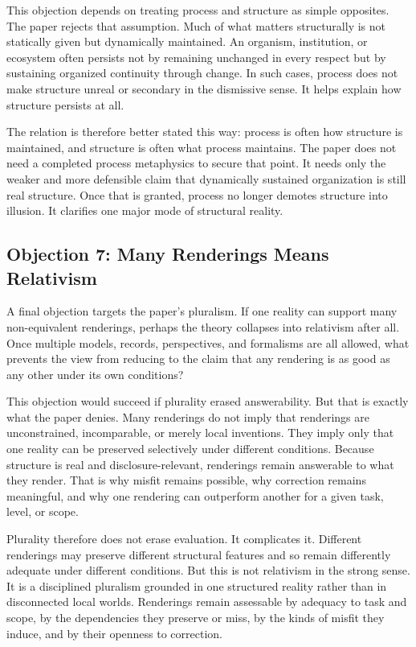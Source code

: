 \documentclass[11pt]{article}
\begin{document}
This objection depends on treating process and structure as simple opposites. The paper rejects that assumption. Much of what matters structurally is not statically given but dynamically maintained. An organism, institution, or ecosystem often persists not by remaining unchanged in every respect but by sustaining organized continuity through change. In such cases, process does not make structure unreal or secondary in the dismissive sense. It helps explain how structure persists at all.

The relation is therefore better stated this way: process is often how structure is maintained, and structure is often what process maintains. The paper does not need a completed process metaphysics to secure that point. It needs only the weaker and more defensible claim that dynamically sustained organization is still real structure. Once that is granted, process no longer demotes structure into illusion. It clarifies one major mode of structural reality.

\subsection{Objection 7: Many Renderings Means Relativism}

A final objection targets the paper's pluralism. If one reality can support many non-equivalent renderings, perhaps the theory collapses into relativism after all. Once multiple models, records, perspectives, and formalisms are all allowed, what prevents the view from reducing to the claim that any rendering is as good as any other under its own conditions?

This objection would succeed if plurality erased answerability. But that is exactly what the paper denies. Many renderings do not imply that renderings are unconstrained, incomparable, or merely local inventions. They imply only that one reality can be preserved selectively under different conditions. Because structure is real and disclosure-relevant, renderings remain answerable to what they render. That is why misfit remains possible, why correction remains meaningful, and why one rendering can outperform another for a given task, level, or scope.

Plurality therefore does not erase evaluation. It complicates it. Different renderings may preserve different structural features and so remain differently adequate under different conditions. But this is not relativism in the strong sense. It is a disciplined pluralism grounded in one structured reality rather than in disconnected local worlds. Renderings remain assessable by adequacy to task and scope, by the dependencies they preserve or miss, by the kinds of misfit they induce, and by their openness to correction.
\end{document}
